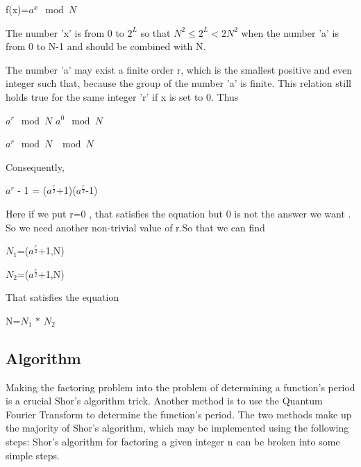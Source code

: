 \documentclass{article}
\begin{document}
\begin{center}
f(x)=$a^x$$\mod{N}$    
\end{center}

The number 'x' is from 0 to $2^L$ so that $N^2$$\leq$$2^L$$<$$2N^2$ when the number 'a' is from 0 to N-1 and should be combined with N.

The number 'a' may exist a finite order r, which is the smallest positive and even integer such that, because the group of the number 'a' is finite. This relation still holds true for the same integer 'r' if x is set to 0. Thus

\begin{center}

$a^r$$\mod{N}$ \equiv $a^0$$\mod{N}$

$a^r$$\mod{N}$  $\mod{N} $

\end{center}



Consequently,
\begin{center}

    $a^r$ - 1 = ($a^\frac{r}{2}$+1)($a^\frac{r}{2}$-1)  
    
\end{center}

Here if we put r=0 , that satisfies the equation but 0 is not the answer we want . So we need another non-trivial value of r.So that we can find 
\begin{center}
    $N_{1}$=\gcd($a^\frac{r}{2}$+1,N)

    \newline

    $N_{2}$=\gcd($a^\frac{r}{2}$+1,N)
\end{center}

That satisfies the equation 
\begin{center}
    N=$N_{1}$ $*$ $N_{2}$
\end{center}

\subsection{Algorithm}

Making the factoring problem into the problem of determining a function's period is a crucial Shor's algorithm trick. Another method is to use the Quantum Fourier Transform to determine the function's period. The two methods make up the majority of Shor's algorithm, which may be implemented using the following steps:
 Shor's algorithm for factoring a given integer n can be broken into some simple steps.
\end{document}
